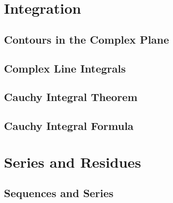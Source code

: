 \newpage
\section{Integration}

\subsection{Contours in the Complex Plane}

\subsection{Complex Line Integrals}

\subsection{Cauchy Integral Theorem}

\subsection{Cauchy Integral Formula}


\newpage
\section{Series and Residues}

\subsection{Sequences and Series}

\begin{definition}[Sequence]
\end{definition}

\begin{definition}[Series]
\end{definition}

\begin{theorem}
\end{theorem}

\begin{definition}
\end{definition}

\begin{definition}
\end{definition}

\begin{theorem}
\end{theorem}


